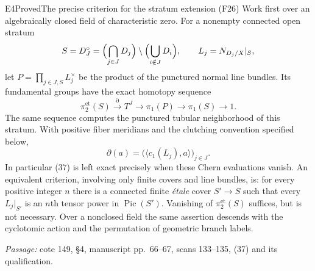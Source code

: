 \begin{result}{E4}{Proved}{The precise criterion for the stratum extension (F26)}
Work first over an algebraically closed field of characteristic zero. For a nonempty connected open stratum
\[
 S=D_J^\circ=\Bigl(\bigcap_{j\in J}D_j\Bigr)\setminus\Bigl(\bigcup_{i\notin J}D_i\Bigr),
 \qquad L_j=N_{D_j/X}|_S,
\]
let $P=\prod_{j\in J,S}L_j^\times$ be the product of the punctured normal line bundles. Its fundamental groups have the exact homotopy sequence
\[
 \pi_2^{\mathrm{et}}(S)\xrightarrow{\partial}T^J
 \longrightarrow\pi_1(P)\longrightarrow\pi_1(S)\longrightarrow1.
\]
The same sequence computes the punctured tubular neighborhood of this stratum. With positive fiber meridians and the clutching convention specified below,
\[
 \partial(a)=\bigl(\langle c_1(L_j),a\rangle\bigr)_{j\in J}.
\]
In particular (37) is left exact precisely when these Chern evaluations vanish. An equivalent criterion, involving only finite covers and line bundles, is: for every positive integer $n$ there is a connected finite \emph{\'etale} cover $S'\to S$ such that every $L_j|_{S'}$ is an $n$th tensor power in $\operatorname{Pic}(S')$. Vanishing of $\pi_2^{\mathrm{et}}(S)$ suffices, but is not necessary. Over a nonclosed field the same assertion descends with the cyclotomic action and the permutation of geometric branch labels.
\par\emph{Passage:} cote 149, \S4, manuscript pp.~66--67, scans 133--135, (37) and its qualification.
\end{result}
